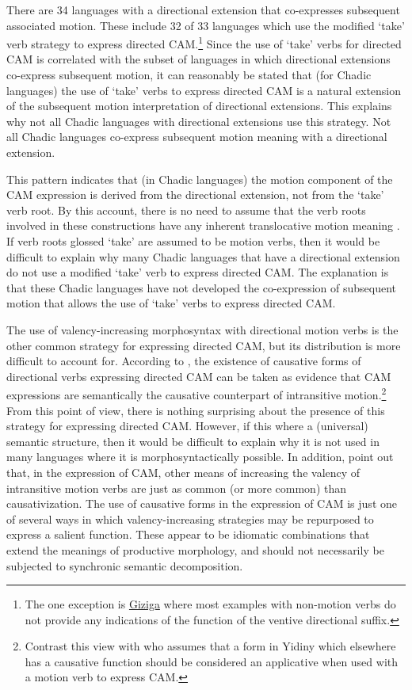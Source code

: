 There are 34 languages with a directional extension that co-expresses subsequent associated motion. These include 32 of 33 languages which use the modified `take' verb strategy to express directed CAM.\footnote{The one exception is \hyperref[gizi]{Giziga} where most examples with non-motion verbs do not provide any indications of the function of the ventive directional suffix.} Since the use of `take' verbs for directed CAM is correlated with the subset of languages in which directional extensions co-express subsequent motion, it can reasonably be stated that (for Chadic languages) the use of `take' verbs to express directed CAM is a natural extension of the subsequent motion interpretation of directional extensions. This explains why not all Chadic languages with directional extensions use this strategy. Not all Chadic languages co-express subsequent motion meaning with a directional extension. 

This pattern indicates that (in Chadic languages) the motion component of the CAM expression is derived from the directional extension, not from the `take' verb root. By this account, there is no need to assume that the verb roots involved in these constructions have any inherent translocative motion meaning \citep[see discussion in][]{narasimhanPuttingTakingEvents2012}. If verb roots glossed `take' are assumed to be motion verbs, then it would be difficult to explain why many Chadic languages that have a directional extension do not use a modified `take' verb to express directed CAM. The explanation is that these Chadic languages have not developed the co-expression of subsequent motion that allows the use of `take' verbs to express directed CAM.

The use of valency-increasing morphosyntax with directional motion verbs is the other common strategy for expressing directed CAM, but its distribution is more difficult to account for. According to  \citet[][9]{jaggarHausaGrade52014}, the existence of causative forms of directional verbs expressing directed CAM can be taken as evidence that CAM expressions are semantically the causative counterpart of intransitive motion.\footnote{Contrast this view with \citet[31]{dixonTypologyCausativesForm2000} who assumes that a form in Yidiny which elsewhere has a causative function should be considered an applicative when used with a motion verb to express CAM.} From this point of view, there is nothing surprising about the presence of this strategy for expressing directed CAM. However, if this where a (universal) semantic structure, then it would be difficult to explain why it is not used in many languages where it is morphosyntactically possible. In addition, \citet[14]{hellwigBringingTakingCrosslinguistic2022} point out that, in the expression of CAM, other means of increasing the valency of intransitive motion verbs are just as common (or more common) than causativization. The use of causative forms in the expression of CAM is just one of several ways in which valency-increasing strategies may be repurposed to express a salient function. These appear to be idiomatic combinations that extend the meanings of productive morphology, and should not necessarily be subjected to synchronic semantic decomposition.  

